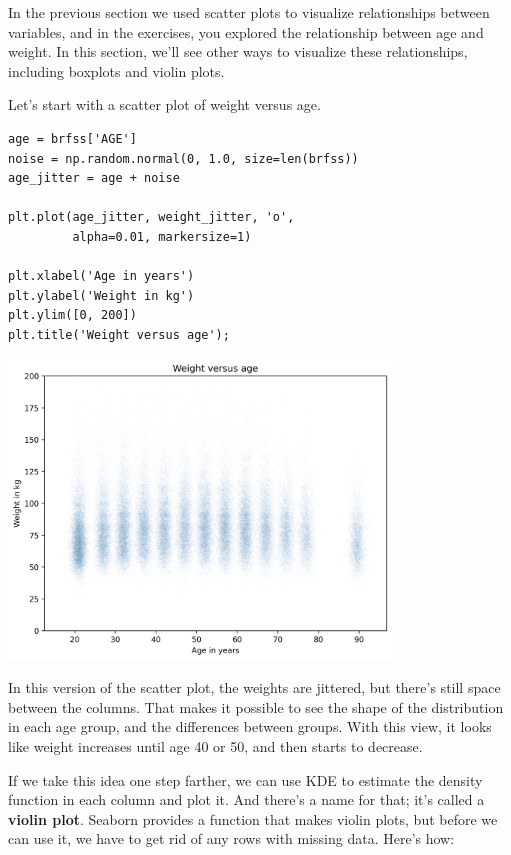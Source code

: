In the previous section we used scatter plots to visualize relationships
between variables, and in the exercises, you explored the relationship
between age and weight. In this section, we'll see other ways to
visualize these relationships, including boxplots and violin plots.

Let's start with a scatter plot of weight versus age.

\begin{lstlisting}[]
age = brfss['AGE']
noise = np.random.normal(0, 1.0, size=len(brfss))
age_jitter = age + noise

plt.plot(age_jitter, weight_jitter, 'o', 
         alpha=0.01, markersize=1)

plt.xlabel('Age in years')
plt.ylabel('Weight in kg')
plt.ylim([0, 200])
plt.title('Weight versus age');
\end{lstlisting}

\begin{center}
\includegraphics[width=4in]{chapters/09_relationships_files/09_relationships_38_0.png}
\end{center}

In this version of the scatter plot, the weights are jittered, but
there's still space between the columns. That makes it possible to see
the shape of the distribution in each age group, and the differences
between groups. With this view, it looks like weight increases until age
40 or 50, and then starts to decrease.

If we take this idea one step farther, we can use KDE to estimate the
density function in each column and plot it. And there's a name for
that; it's called a \textbf{violin plot}. Seaborn provides a function
that makes violin plots, but before we can use it, we have to get rid of
any rows with missing data. Here's how:

